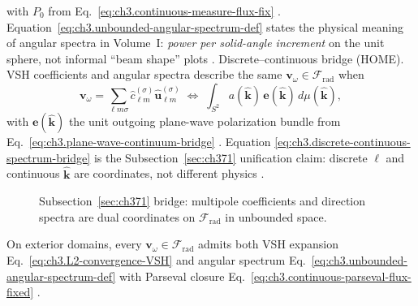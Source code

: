 with \(P_{0}\) from Eq.~\eqref{eq:ch3.continuous-measure-flux-fix} \cite{jackson1999}.
Equation~\eqref{eq:ch3.unbounded-angular-spectrum-def} states the physical meaning of angular spectra in Volume~I:
\emph{power per solid-angle increment} on the unit sphere, not informal ``beam shape'' plots
\cite{poynting1884}.
Discrete--continuous bridge (HOME). VSH coefficients and angular spectra describe the same \(\mathbf{v}_\omega\in\mathcal{F}_{\mathrm{rad}}\) when
\begin{equation}
\label{eq:ch3.discrete-continuous-spectrum-bridge}
\mathbf{v}_\omega
=
\sum_{\ell m\sigma}\widehat{c}_{\ell m}^{(\sigma)}\widehat{\mathbf{u}}_{\ell m}^{(\sigma)}
\;\Longleftrightarrow\;
\int_{S^{2}} a(\widehat{\mathbf{k}})\,\mathbf{e}(\widehat{\mathbf{k}})\,d\mu(\widehat{\mathbf{k}}),
\end{equation}
with \(\mathbf{e}(\widehat{\mathbf{k}})\) the unit outgoing plane-wave polarization bundle from
Eq.~\eqref{eq:ch3.plane-wave-continuum-bridge} \cite{hansen1988}. Equation
\eqref{eq:ch3.discrete-continuous-spectrum-bridge} is the Subsection~\ref{sec:ch371} unification claim: discrete
\(\ell\) and continuous \(\hat{\mathbf{k}}\) are coordinates, not different physics \cite{harrington2001}.
\begin{figure}[t]
\centering
{}
\caption{Subsection~\ref{sec:ch371} bridge: multipole coefficients and direction spectra are dual coordinates on
\(\mathcal{F}_{\mathrm{rad}}\) in unbounded space.}
\label{fig:ch3.371-spectrum-bridge}
\end{figure}
\begin{theorem}
\label{thm:ch3.unbounded-angular-spectrum}
On exterior domains, every \(\mathbf{v}_\omega\in\mathcal{F}_{\mathrm{rad}}\) admits both VSH expansion
Eq.~\eqref{eq:ch3.L2-convergence-VSH} and angular spectrum Eq.~\eqref{eq:ch3.unbounded-angular-spectrum-def} with
Parseval closure Eq.~\eqref{eq:ch3.continuous-parseval-flux-fixed} \cite{hansen1988}.
\end{theorem}
